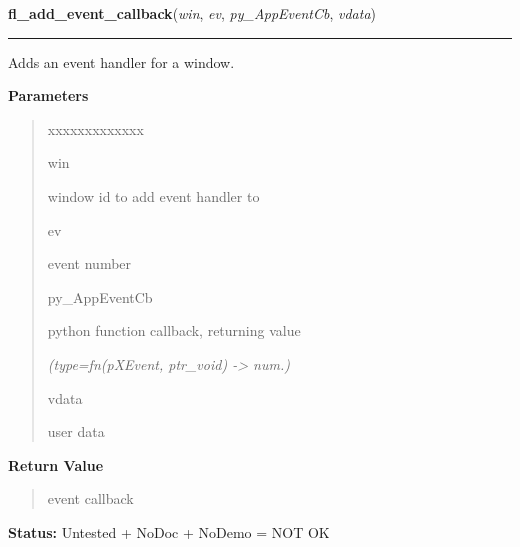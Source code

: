     \vspace{0.5ex}

\hspace{.8\funcindent}\begin{boxedminipage}{\funcwidth}

    \raggedright \textbf{fl\_add\_event\_callback}(\textit{win}, \textit{ev}, \textit{py\_AppEventCb}, \textit{vdata})

    \vspace{-1.5ex}

    \rule{\textwidth}{0.5\fboxrule}
\setlength{\parskip}{2ex}
    Adds an event handler for a window.

\setlength{\parskip}{1ex}
      \textbf{Parameters}
      \vspace{-1ex}

      \begin{quote}
        \begin{Ventry}{xxxxxxxxxxxxx}

          \item[win]

          window id to add event handler to

          \item[ev]

          event number

          \item[py\_AppEventCb]

          python function callback, returning value

            {\it (type=fn(pXEvent, ptr\_void) -{\textgreater} num.)}

          \item[vdata]

          user data

        \end{Ventry}

      \end{quote}

      \textbf{Return Value}
    \vspace{-1ex}

      \begin{quote}
      event callback

      \end{quote}

\textbf{Status:} Untested + NoDoc + NoDemo = NOT OK



    \end{boxedminipage}

